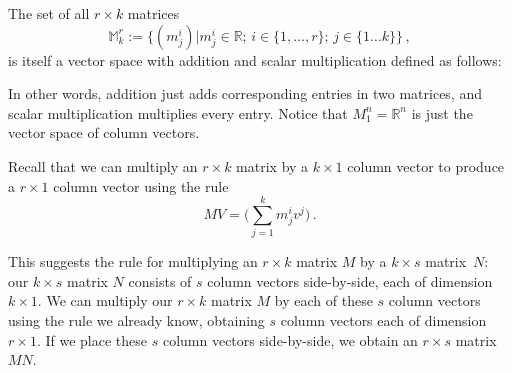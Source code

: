 The set of all $r\times k$ matrices 
\[{\mathbb M}_k^r:=\{(m^i_j)|m^i_j\in {\mathbb R};\,  
i\in \{1,\dots,r\} ;\, 
j\in \{1\dots k\} \}\, ,\] 
is itself  a vector space with  addition and scalar multiplication defined as follows:

In other words, addition just adds corresponding entries in two matrices, and scalar multiplication multiplies every entry.
Notice that $M_1^n = \mathbb{R}^n$ is just the vector space of column vectors.

Recall that we can multiply an \(r \times k\) matrix by a \(k \times 1\) column vector to produce a \(r \times 1\) column vector using the rule
\[MV = \big(\sum_{j=1}^k m_j^i v^j\big)\, .\]

This suggests the rule for multiplying an \(r \times k\) matrix \(M\) by a \(k \times s\) matrix~\(N\): our \(k \times s\) matrix \(N\) consists of \(s\) column vectors side-by-side, each of dimension \(k \times 1.\) We can multiply our \(r \times k\) matrix \(M\) by each of these \(s\) column vectors using the rule we already know, obtaining \(s\) column vectors each of dimension \(r \times 1.\) If we place these \(s\) column vectors side-by-side, we obtain an \(r \times s\) matrix \(MN.\)

